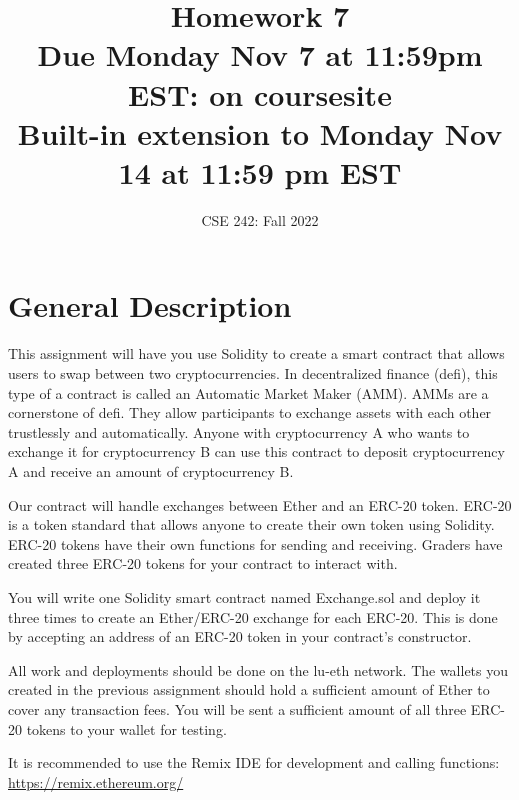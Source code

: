 \documentclass[10pt]{article}
\author{CSE 242:
Fall 2022}
\date{}
\title{Homework 7\\
Due {\bf Monday Nov 7 at 11:59pm EST}: on coursesite\\
Built-in extension to Monday Nov 14 at 11:59 pm EST}
\begin{document}
\maketitle

\section {General Description}
This assignment will have you use Solidity to create a smart contract that allows users to swap between two cryptocurrencies.  In decentralized finance (defi), this type of a contract is called an Automatic Market Maker (AMM).  AMMs are a cornerstone of defi.  They allow participants to exchange assets with each other trustlessly and automatically.  Anyone with cryptocurrency A who wants to exchange it for cryptocurrency B can use this contract to deposit cryptocurrency A and receive an amount of cryptocurrency B.

Our contract will handle exchanges between Ether and an ERC-20 token.  ERC-20 is a token standard that allows anyone to create their own token using Solidity.  ERC-20 tokens have their own functions for sending and receiving.  Graders have created three ERC-20 tokens for your contract to interact with.

You will write one Solidity smart contract named Exchange.sol and deploy it three times to create an Ether/ERC-20 exchange for each ERC-20.  This is done by accepting an address of an ERC-20 token in your contract’s constructor.

All work and deployments should be done on the lu-eth network. The wallets you created in the previous assignment should hold a sufficient amount of Ether to cover any transaction fees.  You will be sent a sufficient amount of all three ERC-20 tokens to your wallet for testing.

It is recommended to use the Remix IDE for development and calling functions: \url{https://remix.ethereum.org/}
\end{document}

